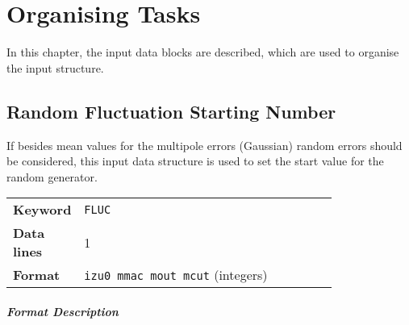 
\chapter{Organising Tasks} \label{OrgTask}

In this chapter, the input data blocks are described, which are used to organise the input structure.

\section{Random Fluctuation Starting Number} \label{FluNum}

If besides mean values for the multipole errors (Gaussian) random errors should be considered, this input data structure is used to set the start value for the random generator.

\bigskip
\begin{tabular}{@{}lp{0.8\linewidth}}
    \textbf{Keyword}    & \texttt{FLUC} \\
    \textbf{Data lines} & 1 \\
    \textbf{Format}     & \texttt{izu0 mmac mout mcut} \/(integers)
\end{tabular}

\paragraph{Format Description}~

